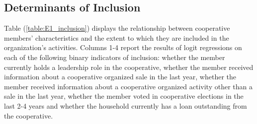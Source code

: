 \documentclass[11pt]{article}
\begin{document}
\subsection{Determinants of Inclusion}

Table (\ref{table:E1_inclusion}) displays the relationship between cooperative members' characteristics and the extent to which they are included in the organization's activities. Columns 1-4 report the results of logit regressions on each of the following binary indicators of inclusion: whether the member currently holds a leadership role in the cooperative, whether the member received information about a cooperative organized sale in the last year, whether the member received information about a cooperative organized activity other than a sale in the last year, whether the member voted in cooperative elections in the last 2-4 years and whether the household currently has a loan outstanding from the cooperative. 
\end{document}

